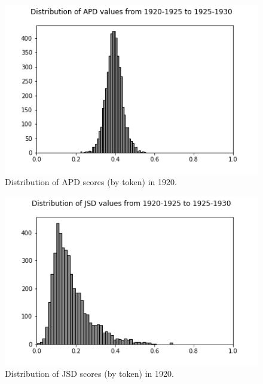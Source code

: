 \documentclass[10pt, a4paper]{article}
\begin{document}
\begin{figure}[!h]
\begin{center}
\includegraphics[scale=0.5]{code/distribution_imgs/1920_APD.png}
\caption{Distribution of APD scores (by token) in 1920.}
\label{1920_APD}
\end{center}
\end{figure}

\begin{figure}[!h]
\begin{center}
\includegraphics[scale=0.5]{code/distribution_imgs/1920_JSD.png}
\caption{Distribution of JSD scores (by token) in 1920.}
\label{1920_JSD}
\end{center}
\end{figure}
\end{document}
